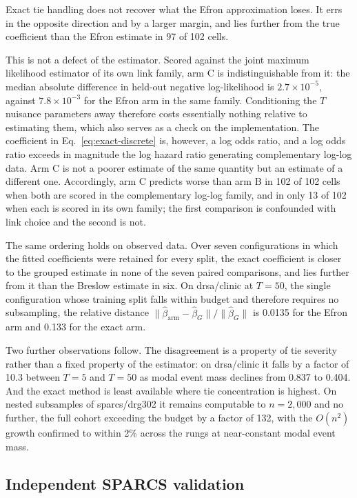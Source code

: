 \documentclass[smallextended,natbib]{svjour3}
\begin{document}
Exact tie handling does not recover what the Efron approximation loses. It errs in the opposite direction and by a larger margin, and lies further from the true coefficient than the Efron estimate in 97 of 102 cells.

This is not a defect of the estimator. Scored against the joint maximum likelihood estimator of its own link family, arm C is indistinguishable from it: the median absolute difference in held-out negative log-likelihood is $2.7\times10^{-5}$, against $7.8\times10^{-3}$ for the Efron arm in the same family. Conditioning the $T$ nuisance parameters away therefore costs essentially nothing relative to estimating them, which also serves as a check on the implementation. The coefficient in Eq.~\eqref{eq:exact-discrete} is, however, a log odds ratio, and a log odds ratio exceeds in magnitude the log hazard ratio generating complementary log-log data. Arm C is not a poorer estimate of the same quantity but an estimate of a different one. Accordingly, arm C predicts worse than arm B in 102 of 102 cells when both are scored in the complementary log-log family, and in only 13 of 102 when each is scored in its own family; the first comparison is confounded with link choice and the second is not.

The same ordering holds on observed data. Over seven configurations in which the fitted coefficients were retained for every split, the exact coefficient is closer to the grouped estimate in none of the seven paired comparisons, and lies further from it than the Breslow estimate in six. On drsa/clinic at $T=50$, the single configuration whose training split falls within budget and therefore requires no subsampling, the relative distance $\lVert\widehat\beta_{\mathrm{arm}}-\widehat\beta_G\rVert/\lVert\widehat\beta_G\rVert$ is 0.0135 for the Efron arm and 0.133 for the exact arm.

Two further observations follow. The disagreement is a property of tie severity rather than a fixed property of the estimator: on drsa/clinic it falls by a factor of 10.3 between $T=5$ and $T=50$ as modal event mass declines from 0.837 to 0.404. And the exact method is least available where tie concentration is highest. On nested subsamples of sparcs/drg302 it remains computable to $n=2{,}000$ and no further, the full cohort exceeding the budget by a factor of 132, with the $O(n^2)$ growth confirmed to within 2\% across the rungs at near-constant modal event mass.

\subsection{Independent SPARCS validation}
\label{sec:heldout}
\end{document}
